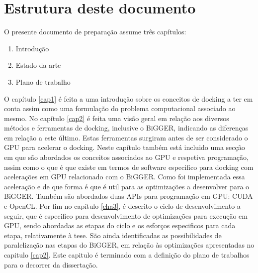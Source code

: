 \section{Estrutura deste documento}
O presente documento de preparação assume três capítulos:
\begin{enumerate}
\item{Introdução}
\item{Estado da arte}
\item{Plano de trabalho}
\end{enumerate}
O capítulo \ref{cap1} é feita a uma introdução sobre os conceitos de docking a ter em conta assim como uma formulação do problema computacional associado ao mesmo. No capítulo \ref{cap2} é feita uma visão geral em relação aos diversos métodos e ferramentas de docking, inclusive o BiGGER, indicando as diferenças em relação a este último. Estas ferramentas surgiram antes de ser considerado o GPU para acelerar o docking. Neste capítulo também está incluido uma secção em que são abordados os conceitos associados ao GPU e respetiva programação, assim como o que é que existe em termos de software especifico para docking com acelerações em GPU relacionado com o BiGGER. Como foi implementada essa aceleração e de que forma é que é util para as optimizações a desenvolver para o BiGGER. Também são abordados duas APIs para programação em GPU: CUDA e OpenCL.
Por fim no capítulo \ref{cha3}, é descrito o ciclo de desenvolvimento a seguir, que é especifico para desenvolvimento de optimizações para execução em GPU, sendo abordadas as etapas do ciclo e os esforços especificos para cada etapa, relativamente à tese. São ainda identificadas as possibilidades de paralelização nas etapas do BiGGER, em relação às optimizações apresentadas no capitulo \ref{cap2}. Este capitulo é terminado com a definição do plano de trabalhos para o decorrer da dissertação.




